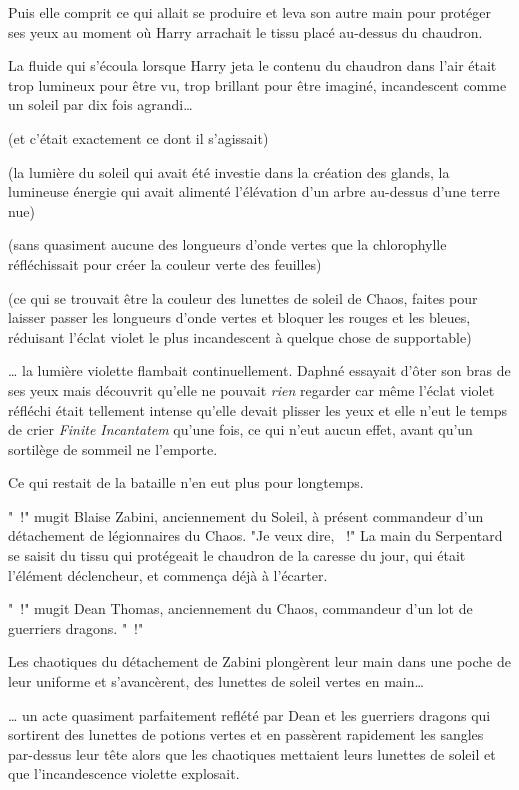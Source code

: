Puis elle comprit ce qui allait se produire et leva son autre main pour protéger ses yeux au moment où Harry arrachait le tissu placé au-dessus du chaudron.

La fluide qui s'écoula lorsque Harry jeta le contenu du chaudron dans l'air était trop lumineux pour être vu, trop brillant pour être imaginé, incandescent comme un soleil par dix fois agrandi…

(et c'était exactement ce dont il s'agissait)

(la lumière du soleil qui avait été investie dans la création des glands, la lumineuse énergie qui avait alimenté l'élévation d'un arbre au-dessus d'une terre nue)

(sans quasiment aucune des longueurs d'onde vertes que la chlorophylle réfléchissait pour créer la couleur verte des feuilles)

(ce qui se trouvait être la couleur des lunettes de soleil de Chaos, faites pour laisser passer les longueurs d'onde vertes et bloquer les rouges et les bleues, réduisant l'éclat violet le plus incandescent à quelque chose de supportable)

… la lumière violette flambait continuellement. Daphné essayait d'ôter son bras de ses yeux mais découvrit qu'elle ne pouvait \emph{rien} regarder car même l'éclat violet réfléchi était tellement intense qu'elle devait plisser les yeux et elle n'eut le temps de crier \emph{Finite Incantatem} qu'une fois, ce qui n'eut aucun effet, avant qu'un sortilège de sommeil ne l'emporte.

Ce qui restait de la bataille n'en eut plus pour longtemps.

\later

"~!" mugit Blaise Zabini, anciennement du Soleil, à présent commandeur d'un détachement de légionnaires du Chaos. "Je veux dire, ~!" La main du Serpentard se saisit du tissu qui protégeait le chaudron de la caresse du jour, qui était l'élément déclencheur, et commença déjà à l'écarter.

"~!" mugit Dean Thomas, anciennement du Chaos, commandeur d'un lot de guerriers dragons. "~!"

Les chaotiques du détachement de Zabini plongèrent leur main dans une poche de leur uniforme et s'avancèrent, des lunettes de soleil vertes en main…

… un acte quasiment parfaitement reflété par Dean et les guerriers dragons qui sortirent des lunettes de potions vertes et en passèrent rapidement les sangles par-dessus leur tête alors que les chaotiques mettaient leurs lunettes de soleil et que l'incandescence violette explosait.

